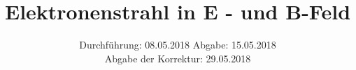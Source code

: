 

\subject{Versuche 501 und 502}
\title{Elektronenstrahl in E - und B-Feld}
\date{
  Durchführung: 08.05.2018
  \hspace{3em}
  Abgabe: 15.05.2018\\
  Abgabe der Korrektur: 29.05.2018
}



      \maketitle
      \thispagestyle{empty}
      \tableofcontents
      \newpage
      
      
      \newpage
      
      
      
      
      \printbibliography{}
      

